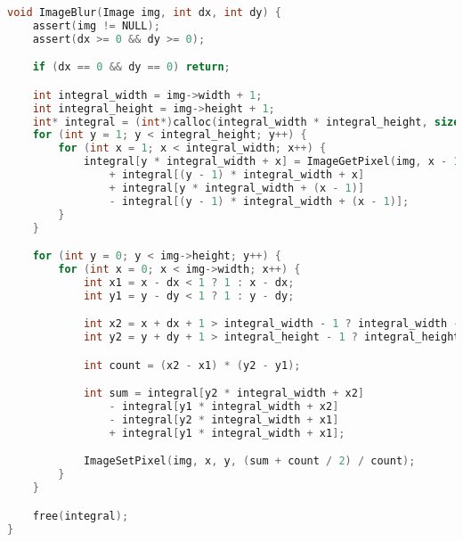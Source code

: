 \begin{lstlisting}[language=C]
void ImageBlur(Image img, int dx, int dy) {
    assert(img != NULL);
    assert(dx >= 0 && dy >= 0);

    if (dx == 0 && dy == 0) return;

    int integral_width = img->width + 1;
    int integral_height = img->height + 1;
    int* integral = (int*)calloc(integral_width * integral_height, sizeof(int));
    for (int y = 1; y < integral_height; y++) {
        for (int x = 1; x < integral_width; x++) {
            integral[y * integral_width + x] = ImageGetPixel(img, x - 1, y - 1)   
                + integral[(y - 1) * integral_width + x]                          
                + integral[y * integral_width + (x - 1)]                          
                - integral[(y - 1) * integral_width + (x - 1)];                   
        }
    }

    for (int y = 0; y < img->height; y++) {
        for (int x = 0; x < img->width; x++) {
            int x1 = x - dx < 1 ? 1 : x - dx;
            int y1 = y - dy < 1 ? 1 : y - dy;

            int x2 = x + dx + 1 > integral_width - 1 ? integral_width - 1 : x + dx + 1;
            int y2 = y + dy + 1 > integral_height - 1 ? integral_height - 1 : y + dy + 1;

            int count = (x2 - x1) * (y2 - y1);

            int sum = integral[y2 * integral_width + x2]
                - integral[y1 * integral_width + x2]
                - integral[y2 * integral_width + x1]
                + integral[y1 * integral_width + x1];

            ImageSetPixel(img, x, y, (sum + count / 2) / count);
        }
    }

    free(integral);
}
\end{lstlisting}

